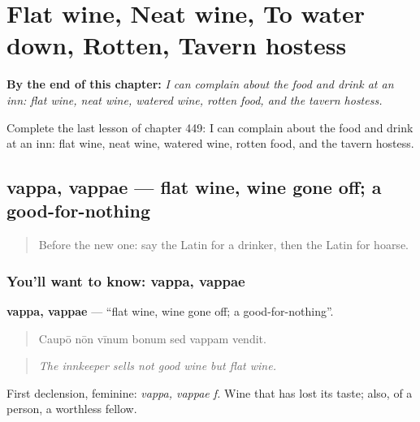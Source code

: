 
\chapter{Flat wine, Neat wine, To water down, Rotten, Tavern hostess}
\label{ch:la-flat-wine-neat-wine-to-water-down-rotten-tavern-hostess}

\begin{chapteropening}
\textbf{By the end of this chapter:} \emph{I can complain about the food and drink at an inn: flat wine, neat wine, watered wine, rotten food, and the tavern hostess.}

Complete the last lesson of chapter 449: I can complain about the food and drink at an inn: flat wine, neat wine, watered wine, rotten food, and the tavern hostess.
\end{chapteropening}

\section[vappa, vappae]{vappa, vappae — flat wine, wine gone off; a good-for-nothing}

\label{lesson:LA-C449-vappa}



\begin{quote}
Before the new one: say the Latin for a drinker, then the Latin for hoarse.
\end{quote}

\subsection*{You'll want to know: vappa, vappae}
\textbf{vappa, vappae} — \textquotedblleft{}flat wine, wine gone off; a good-for-nothing\textquotedblright{}.

\begin{quote}
Caupō nōn vīnum bonum sed vappam vendit.
\end{quote}

\begin{quote}
\emph{The innkeeper sells not good wine but flat wine.}
\end{quote}

First declension, feminine: \emph{vappa, vappae f.} Wine that has lost its taste; also, of a person, a worthless fellow.

